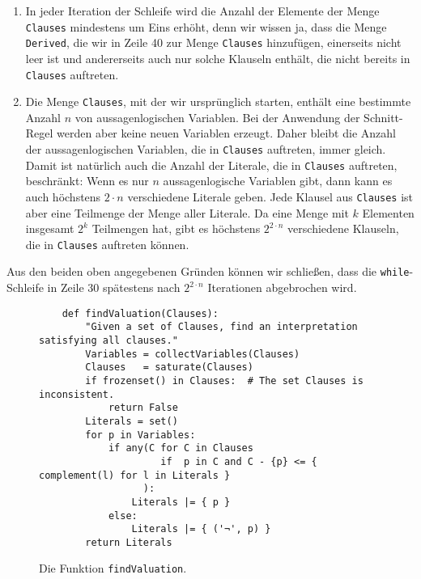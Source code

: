 \begin{enumerate}
\item In jeder Iteration der Schleife wird die Anzahl der Elemente der Menge \texttt{Clauses}
      mindestens um Eins erhöht, denn wir wissen ja, dass die Menge \texttt{Derived}, die wir in Zeile 40 zur
      Menge \texttt{Clauses} hinzufügen, einerseits nicht leer ist und andererseits auch nur solche
      Klauseln enthält, die nicht bereits in \texttt{Clauses} auftreten.
\item Die Menge \texttt{Clauses}, mit der wir ursprünglich starten, enthält eine bestimmte Anzahl $n$
      von aussagenlogischen Variablen.  Bei der Anwendung der Schnitt-Regel werden aber keine neuen
      Variablen erzeugt.  Daher bleibt die Anzahl der aussagenlogischen Variablen, die in
      \texttt{Clauses} auftreten, immer gleich.  Damit ist natürlich auch die Anzahl der Literale,
      die in \texttt{Clauses} auftreten, beschränkt: Wenn es nur $n$ aussagenlogische Variablen gibt,
      dann kann es auch höchstens $2 \cdot n$ verschiedene Literale geben.  Jede Klausel aus \texttt{Clauses} ist
      aber eine Teilmenge der Menge aller Literale.  Da eine Menge mit $k$ Elementen insgesamt $2^k$
      Teilmengen hat, gibt es höchstens $2^{2 \cdot n}$ verschiedene Klauseln, die in
      \texttt{Clauses} auftreten können.  
\end{enumerate}
Aus den beiden oben angegebenen Gründen können wir schließen, dass die \texttt{while}-Schleife in
Zeile 30 spätestens nach $2^{2 \cdot n}$ Iterationen abgebrochen wird.


\begin{figure}[!ht]
\centering
\begin{verbatim}
    def findValuation(Clauses):
        "Given a set of Clauses, find an interpretation satisfying all clauses."
        Variables = collectVariables(Clauses)
        Clauses   = saturate(Clauses)
        if frozenset() in Clauses:  # The set Clauses is inconsistent.
            return False
        Literals = set()
        for p in Variables:
            if any(C for C in Clauses 
                     if  p in C and C - {p} <= { complement(l) for l in Literals }
                  ):
                Literals |= { p }
            else:
                Literals |= { ('¬', p) }
        return Literals
\end{verbatim}
\vspace*{-0.3cm}
\caption{Die Funktion \texttt{findValuation}.}
\label{fig:Completeness.ipynb-3}
\end{figure}

